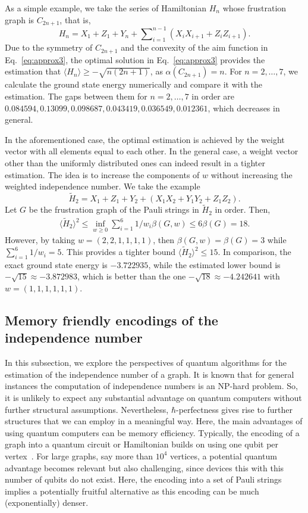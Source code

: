 \documentclass[
12pt,
prx,
aps,
reprint,
a4paper,
longbibliograph,
nofootinbib,
nobibnotes,
superscriptaddress
]{revtex4-2}
\theoremstyle{definition}
\begin{document}
As a simple example, we take the series of Hamiltonian $H_n$ whose frustration graph is $C_{2n+1}$, that is,
\begin{equation}
	H_n = X_1 + Z_1 + Y_n + \sum\nolimits_{i=1}^{n-1} (X_iX_{i+1} + Z_i Z_{i+1}).
\end{equation}
Due to the symmetry of $C_{2n+1}$ and the convexity of the aim function in Eq.~\eqref{eq:approx3},
the optimal solution in Eq.~\eqref{eq:approx3} provides the estimation that $\langle H_n\rangle \ge -\sqrt{n(2n+1)}$, as $\alpha(C_{2n+1}) = n$.
For $n = 2, \ldots, 7$, we calculate the ground state energy numerically and compare it with the estimation.
The gaps between them for $n=2, \ldots, 7$ in order are
$0.084594, 0.13099, 0.098687, 0.043419, 0.036549, 0.012361$, which decreases in general.

In the aforementioned case, the optimal estimation is achieved by the weight vector with all elements equal to each other.
In the general case, a weight vector other than the uniformly distributed ones can indeed result in a tighter estimation.
The idea is to increase the components of $w$ without increasing the weighted independence number. 
We take the example
\begin{equation}
	\tilde{H}_2 = X_1 + Z_1 + Y_2 + \left( X_1X_2 + Y_1Y_2 + Z_1Z_2 \right).
\end{equation}
Let $G$ be the frustration graph of the Pauli strings in $\tilde{H}_2$ in order.
Then,
\begin{align}
	\langle \tilde{H}_2\rangle^2 \le \inf_{w\ge 0} \sum_{i=1}^6 1/w_i \beta(G,w) \le 6 \beta(G) = 18.
    \end{align}
However, by taking $w=(2,2,1,1,1,1)$, then $\beta(G,w) = \beta(G)=3$ while $\sum_{i=1}^6 1 /w_i = 5$. This provides a tighter bound $\langle \tilde{H}_2\rangle^2 \le 15$. In comparison, the exact ground state energy is $-3.722935$, while the estimated lower bound is $-\sqrt{15} \approx -3.872983$, which is better than the one $-\sqrt{18} \approx -4.242641$ with $w=(1,1,1,1,1,1)$. 
\subsection{Memory friendly encodings of the independence number}\label{ssec:encoding}
In this subsection, we explore the perspectives of quantum algorithms for the estimation of the independence number of a graph. 
It is known that for  general instances the computation of independence numbers is an NP-hard problem. So, it is unlikely to expect any substantial advantage on quantum computers without further structural assumptions. 
Nevertheless,  $\hbar$-perfectness gives rise to further structures that we can employ in a meaningful way. Here, the main advantages of using quantum computers can be memory efficiency. 
Typically, the encoding of a graph into a quantum circuit or Hamiltonian builds on using one qubit per vertex~\cite{Farhi2014AQA,Zhou2018QuantumAO,Skolik2022EquivariantQC}. For large graphs, say more than $10^4$ vertices, a potential quantum advantage becomes relevant but also challenging, since devices this with this number of qubits do not exist.
Here, the encoding into a set of Pauli strings implies a potentially fruitful alternative as this encoding can be much (exponentially) denser. 
\end{document}
